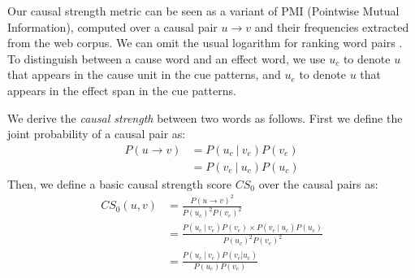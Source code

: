 Our causal strength metric can be seen as a variant of
PMI (Pointwise Mutual Information), computed over a causal
pair $u \rightarrow v$ and their frequencies extracted from the web corpus. We
can omit the usual logarithm for ranking word pairs \cite{Washtell09:CWW}.
To distinguish between a cause word and an effect word, we use $u_c$
to denote $u$ that appears in the cause unit in the cue patterns,
and $u_e$ to denote $u$ that appears in the effect span in the cue
patterns.

We derive the {\em causal strength} between two words as follows.
First we define the joint probability of a causal pair as:
\begin{align}
P(u \rightarrow v) &= P(u_c~|~v_e)P(v_e) \nonumber \\
 &= P(v_e~|~u_c)P(u_c) \label{eq:joint}
\end{align}
Then, we define a basic causal strength score $CS_0$ over the causal pairs as:
\begin{align}
CS_0 (u,v) &= \frac{P(u \rightarrow v)^2}{P(u_c)^2 P(v_e)^2} \nonumber\\
 &= \frac{P(u_c ~|~ v_e)P(v_e) \times P(v_e~|~u_c)P(u_c)}{P(u_c)^2 P(v_e)^2} \nonumber\\
 &= \frac{P(u_c ~|~ v_e)P(v_e | u_c)}{P(u_c)P(v_e)}
\label{eq:pmi2}
\end{align}

